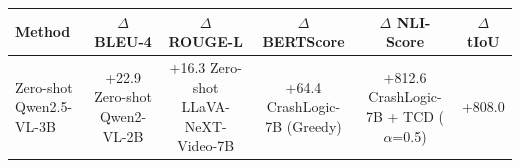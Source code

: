 \begin{tabular}{lccccc}
\toprule
Method & $\Delta$ BLEU-4 & $\Delta$ ROUGE-L & $\Delta$ BERTScore & $\Delta$ NLI-Score & $\Delta$ tIoU \\
\midrule
Zero-shot Qwen2.5-VL-3B & +22.9%
Zero-shot Qwen2-VL-2B & +16.3%
Zero-shot LLaVA-NeXT-Video-7B & +64.4%
CrashLogic-7B (Greedy) & +812.6%
CrashLogic-7B + TCD ($\alpha$=0.5) & +808.0%
\bottomrule
\end{tabular}
